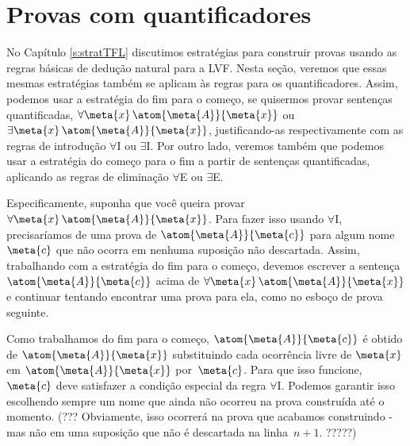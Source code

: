 
\chapter{Provas com quantificadores}

No Capítulo \ref{s:stratTFL}  discutimos estrat\'egias para construir provas usando as regras b\'asicas de dedu\c c\~ao natural para a LVF.  Nesta se\c c\~ao, veremos que essas mesmas estrat\'egias tamb\'em se aplicam \`as regras para os quantificadores. Assim, podemos usar a estrat\'egia do fim para o come\c co, se quisermos provar senten\c cas quantificadas,  $\forall \meta{x}\, \atom{\meta{A}}{\meta{x}}$ ou $\exists \meta{x}\, \atom{\meta{A}}{\meta{x}}$, justificando-as respectivamente com as regras de introdu\c c\~ao $\forall$I ou $\exists$I. Por outro lado, veremos tamb\'em que podemos usar a estrat\'egia do come\c co para o fim a partir de senten\c cas quantificadas, aplicando as regras de elimina\c c\~ao $\forall$E ou $\exists$E.

Especificamente, suponha que voc\^e queira provar $\forall \meta{x}\, \atom{\meta{A}}{\meta{x}}$. Para fazer isso usando $\forall$I, precisar\'iamos de uma prova de $\atom{\meta{A}}{\meta{c}}$ para algum nome~$\meta{c}$ que n\~ao ocorra em nenhuma suposi\c c\~ao n\~ao descartada. Assim, trabalhando com a estrat\'egia do fim para o come\c co, devemos escrever  a senten\c ca $\atom{\meta{A}}{\meta{c}}$ acima de $\forall \meta{x}\, \atom{\meta{A}}{\meta{x}}$ e continuar tentando encontrar uma prova para ela, como no esbo\c co de prova seguinte. 
 
\begin{fitchproof}
	\ellipsesline
\end{fitchproof}
 
Como trabalhamos do fim para o come\c co,  $\atom{\meta{A}}{\meta{c}}$ \'e obtido de $\atom{\meta{A}}{\meta{x}}$ substituindo cada ocorr\^encia livre de $\meta{x}$ em $\atom{\meta{A}}{\meta{x}}$ por~$\meta{c}$. Para que isso funcione, $\meta{c}$ deve satisfazer a condi\c c\~ao especial da regra $\forall$I. Podemos garantir isso escolhendo sempre um nome que ainda n\~ao ocorreu na prova constru\'ida at\'e o momento. (??? Obviamente, isso ocorrer\'a na prova que acabamos construindo - mas n\~ao em uma suposi\c c\~ao que n\~ao \'e descartada na linha~$n + 1$.  ?????)


